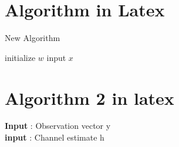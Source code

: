 \documentclass[a4paper, 12pt]{article}
\begin{document}
	\begin{comment}
		
	
	\begin{table}[h]
		{
			\centering Do vertical stretch
			\caption{My table}
			\renewcommand{\arraystretch}{2}  
			\begin{tabular}{m{3cm}|m{4cm}|m{2cm}}
				\toprule[2pt]
				Name & Age & Height\\ 
				\midrule[1.5pt]
				A  & 23 & 176 \\ \midrule
				B  & 24 & 175 \\ \midrule
				C  & 25 & 177\\ \midrule
				D  & 36 & 178 \\ 
				\bottomrule[1.5pt]
			\end{tabular}
		}
	\end{table} 
	
	  \newpage
	  \begin{table}[h]
	  	\centering\caption{My table}
	  	\begin{tabular} to 0.8\textwidth {x[c]|x[c]|x[c]}
	  		\toprule[2pt]
	  		Name & Age & Height\\ 
	  		\midrule[1.5pt]
	  		A  & 23 & 176 \\ \midrule
	  		B  & 24 & 175 \\ \midrule
	  		C  & 25 & 177\\ \midrule
	  		D  & 36 & 178 \\ 
	  		\bottomrule[1.5pt]
	  	\end{tabular}
	  \end{table}   
	
	
	
\end{comment}
	\newpage
	
	\section{Algorithm in Latex}
	
	\begin{algorithm}
		\caption{New Algorithm}
		\begin{algorithmic}
			\STATE initialize $w$
			\STATE input $x$
			\ENDWHILE
			\ENDFOR
			\end{algorithmic}
		\end{algorithm}	
	
	\section{Algorithm 2 in latex}
	\textbf{Input} : Observation vector y\\
	\textbf{input} : Channel estimate h
	
\end{document}
